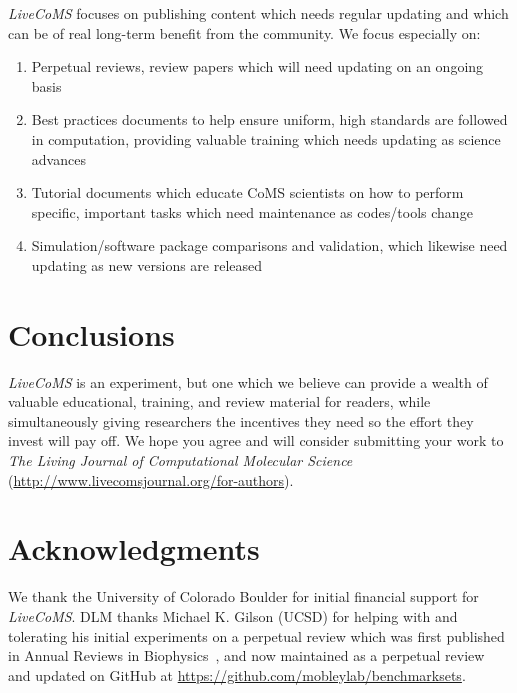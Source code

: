 \documentclass[9pt,editorial]{livecoms}
\begin{document}
\emph{LiveCoMS} focuses on publishing content which needs regular updating and which can be of real long-term benefit from the community.
We focus especially on:
\begin{enumerate}
\item Perpetual reviews, review papers which will need updating on an ongoing basis
\item Best practices documents to help ensure uniform, high standards are followed in computation, providing valuable training which needs updating as science advances
\item Tutorial documents which educate CoMS scientists on how to perform specific, important tasks which need maintenance as codes/tools change
\item Simulation/software package comparisons and validation, which likewise need updating as new versions are released
\end{enumerate}

\section{Conclusions}

\emph{LiveCoMS} is an experiment, but one which we believe can provide a wealth of valuable educational, training, and review material for readers, while simultaneously giving researchers the incentives they need so the effort they invest will pay off.
We hope you agree and will consider submitting your work to \emph{The Living Journal of Computational Molecular Science} (\url{http://www.livecomsjournal.org/for-authors}).


\section{Acknowledgments}

We thank the University of Colorado Boulder for initial financial support for \emph{LiveCoMS}. 
DLM thanks Michael K. Gilson (UCSD) for helping with and tolerating his initial experiments on a perpetual review which was first published in Annual Reviews in Biophysics~\cite{Mobley:2017:AnnualReviewofBiophysics}, and now maintained as a perpetual review~\cite{Mobley:2017:eScholarshipa} and updated on GitHub at \url{https://github.com/mobleylab/benchmarksets}.


\end{document}
